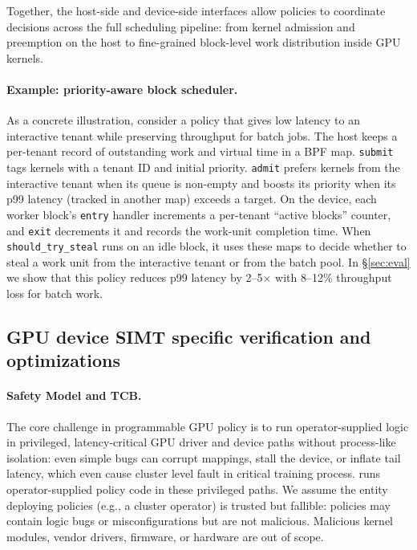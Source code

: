 Together, the host-side and device-side interfaces allow \sys policies to coordinate decisions across the full scheduling pipeline: from kernel admission and preemption on the host to fine-grained block-level work distribution inside GPU kernels.

\paragraph{Example: priority-aware block scheduler.}
As a concrete illustration, consider a policy that gives low latency to an interactive tenant while preserving throughput for batch jobs. The host keeps a per-tenant record of outstanding work and virtual time in a BPF map. \texttt{submit} tags kernels with a tenant ID and initial priority. \texttt{admit} prefers kernels from the interactive tenant when its queue is non-empty and boosts its priority when its p99 latency (tracked in another map) exceeds a target. On the device, each worker block's \texttt{entry} handler increments a per-tenant ``active blocks'' counter, and \texttt{exit} decrements it and records the work-unit completion time. When \texttt{should\_try\_steal} runs on an idle block, it uses these maps to decide whether to steal a work unit from the interactive tenant or from the batch pool. In \S\ref{sec:eval} we show that this policy reduces p99 latency by 2--5$\times$ with 8--12\% throughput loss for batch work.

\subsection{\sys GPU device SIMT specific verification and optimizations}
\label{sec:safety-model}

\paragraph{Safety Model and TCB.}
The core challenge in programmable GPU policy is to run operator-supplied logic in privileged, latency-critical GPU driver and device paths without process-like isolation: even simple bugs can corrupt mappings, stall the device, or inflate tail latency, which even cause cluster level fault in critical training process. \sys runs operator-supplied policy code in these privileged paths. We assume the entity deploying \sys policies (e.g., a cluster operator) is trusted but fallible: policies may contain logic bugs or misconfigurations but are not malicious. Malicious kernel modules, vendor drivers, firmware, or hardware are out of scope.


